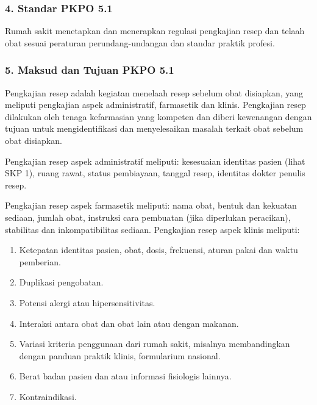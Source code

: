 \documentclass[
]{book}
\providecommand{\tightlist}{%
  \setlength{\itemsep}{0pt}\setlength{\parskip}{0pt}}
\begin{document}
\hypertarget{standar-pkpo-5.1}{%
\subsubsection*{4. Standar PKPO 5.1}\label{standar-pkpo-5.1}}

Rumah sakit menetapkan dan menerapkan regulasi pengkajian resep dan telaah obat sesuai peraturan perundang-undangan dan standar praktik profesi.

\hypertarget{maksud-dan-tujuan-pkpo-5.1}{%
\subsubsection*{5. Maksud dan Tujuan PKPO 5.1}\label{maksud-dan-tujuan-pkpo-5.1}}

Pengkajian resep adalah kegiatan menelaah resep sebelum obat disiapkan, yang meliputi pengkajian aspek administratif, farmasetik dan klinis. Pengkajian resep dilakukan oleh tenaga kefarmasian yang kompeten dan diberi kewenangan dengan tujuan untuk mengidentifikasi dan menyelesaikan masalah terkait obat sebelum obat disiapkan.

Pengkajian resep aspek administratif meliputi: kesesuaian identitas pasien (lihat SKP 1), ruang rawat, status pembiayaan, tanggal resep, identitas dokter penulis resep.

Pengkajian resep aspek farmasetik meliputi: nama obat, bentuk dan kekuatan sediaan, jumlah obat, instruksi cara pembuatan (jika diperlukan peracikan), stabilitas dan inkompatibilitas sediaan.
Pengkajian resep aspek klinis meliputi:

\begin{enumerate}
\def\labelenumi{\alph{enumi}.}
\tightlist
\item
  Ketepatan identitas pasien, obat, dosis, frekuensi, aturan pakai dan waktu pemberian.
\item
  Duplikasi pengobatan.
\item
  Potensi alergi atau hipersensitivitas.
\item
  Interaksi antara obat dan obat lain atau dengan makanan.
\item
  Variasi kriteria penggunaan dari rumah sakit, misalnya membandingkan dengan panduan praktik klinis, formularium nasional.
\item
  Berat badan pasien dan atau informasi fisiologis lainnya.
\item
  Kontraindikasi.
\end{enumerate}
\end{document}
